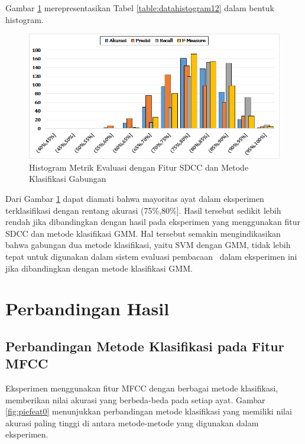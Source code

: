   Gambar \ref{fig:histogram12} merepresentasikan Tabel \ref{table:datahistogram12} dalam bentuk histogram.
  \begin{figure}
    \centering
    \includegraphics[width=\linewidth]{pics/histogram12}
    \caption{Histogram Metrik Evaluasi dengan Fitur SDCC dan Metode Klasifikasi Gabungan}
    \label{fig:histogram12}
  \end{figure}

  Dari Gambar \ref{fig:histogram12} dapat diamati bahwa mayoritas ayat dalam eksperimen terklasifikasi dengan rentang akurasi (75\%,80\%]. Hasil tersebut sedikit lebih rendah jika dibandingkan dengan hasil pada eksperimen yang menggunakan fitur SDCC dan metode klasifikasi GMM. Hal tersebut semakin mengindikasikan bahwa gabungan dua metode klasifikasi, yaitu SVM dengan GMM, tidak lebih tepat untuk digunakan dalam sistem evaluasi pembacaan \quran~dalam eksperimen ini jika dibandingkan dengan metode klasifikasi GMM.

















\section{Perbandingan Hasil}

  \subsection{Perbandingan Metode Klasifikasi pada Fitur MFCC}
  Eksperimen menggunakan fitur MFCC dengan berbagai metode klasifikasi, memberikan nilai akurasi yang berbeda-beda pada setiap ayat. Gambar \ref{fig:piefeat0} menunjukkan perbandingan metode klasifikasi yang memiliki nilai akurasi paling tinggi di antara metode-metode yang digunakan dalam eksperimen.

